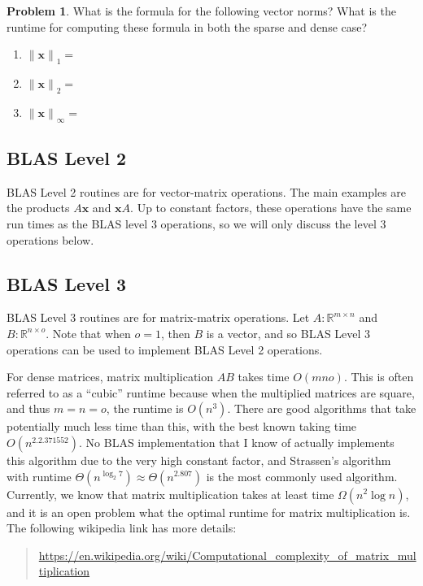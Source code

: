 \documentclass[10pt]{article}
\theoremstyle{definition}
\newtheorem{problem}{Problem}
\newcommand{\R}{\mathbb R}
\newcommand{\x}{\mathbf x}
\newcommand{\lone}[1]{{\lVert {#1} \rVert}_1}
\newcommand{\ltwo}[1]{{\lVert {#1} \rVert}_2}
\newcommand{\lp}[1]{{\lVert {#1} \rVert}_p}
\newcommand{\linf}[1]{{\lVert {#1} \rVert}_\infty}
\begin{document}
\begin{problem}
    What is the formula for the following vector norms?
    What is the runtime for computing these formula in both the sparse and dense case?
    \begin{enumerate}
        \item $\lone{\x}=$
            \vspace{2in}
        \item $\ltwo{\x}=$
            \vspace{2in}
        \item $\linf{\x}=$
            \vspace{2in}
    \end{enumerate}
\end{problem}

\newpage
\subsection{BLAS Level 2}

BLAS Level 2 routines are for vector-matrix operations.
The main examples are the products $A\x$ and $\x A$.
Up to constant factors, these operations have the same run times as the BLAS level 3 operations, so we will only discuss the level 3 operations below.

\subsection{BLAS Level 3}

BLAS Level 3 routines are for matrix-matrix operations.
Let $A : \R^{m\times n}$ and $B : \R^{n \times o}$.
Note that when $o=1$, then $B$ is a vector, and so BLAS Level 3 operations can be used to implement BLAS Level 2 operations.

For dense matrices, matrix multiplication $AB$ takes time $O(mno)$.
This is often referred to as a ``cubic'' runtime because when the multiplied matrices are square,
and thus $m=n=o$,
the runtime is $O(n^3)$.
There are good algorithms that take potentially much less time than this,
with the best known taking time $O(n^{2.2.371552})$.
No BLAS implementation that I know of actually implements this algorithm due to the very high constant factor,
and Strassen's algorithm with runtime $\Theta(n^{\log_2 7})\approx\Theta(n^{2.807})$ is the most commonly used algorithm.
Currently, we know that matrix multiplication takes at least time $\Omega(n^2\log n)$,
and it is an open problem what the optimal runtime for matrix multiplication is.
The following wikipedia link has more details:
\begin{quote}
    \url{https://en.wikipedia.org/wiki/Computational_complexity_of_matrix_multiplication}
\end{quote}
\end{document}
